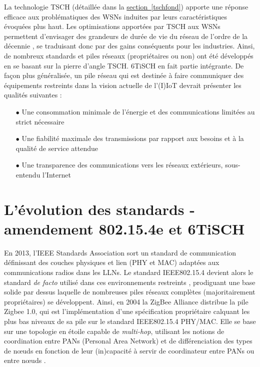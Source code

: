 \documentclass[]{report}
\newcommand{\wordlink}[2]{\hyperref[#2]{#1~\ref{#2}}}
\begin{document}
\par La technologie TSCH (détaillée dans la \wordlink{section}{tschfond}) apporte une réponse efficace aux problématiques des WSNs induites par leurs caractéristiques évoquées plus haut. Les optimisations apportées par TSCH aux WSNs permettent d'envisager des grandeurs de durée de vie du réseau de l'ordre de la décennie \cite{SODA}, se traduisant donc par des gains conséquents pour les industries. Ainsi, de nombreux standards et piles réseaux (propriétaires ou non) ont été développés en se basant sur la pierre d'angle TSCH. 6TiSCH en fait partie intégrante. De façon plus généralisée, un pile réseau qui est destinée à faire communiquer des équipements restreints dans la vision actuelle de l'(I)IoT devrait présenter les qualités suivantes \cite{stack-IoT} :\\
\begin{itemize}
\vspace{0.2cm}
\item[$\bullet$] Une consommation minimale de l'énergie et des communications limitées au strict nécessaire
\vspace{0.2cm}
\item[$\bullet$] Une fiabilité maximale des transmissions par rapport aux besoins et à la qualité de service attendue
\vspace{0.2cm}
\item[$\bullet$] Une transparence des communications vers les réseaux extérieurs, sous-entendu l'Internet \cite{6TiSCH-industrial-perf}
\end{itemize}

\newpage

\section{L'évolution des standards - amendement 802.15.4e et 6TiSCH}

En 2013, l'IEEE Standards Association sort un standard de communication définissant des couches physiques et lien (PHY et MAC) adaptées aux communications radios dans les LLNs. Le standard IEEE802.15.4 devient alors le standard \textit{de facto} utilisé dans ces environnements restreints \cite{6top-perf}, prodiguant une base solide par dessus laquelle de nombreuses piles réseaux complètes (majoritairement propriétaires) se développent. Ainsi, en 2004 la ZigBee Alliance distribue la pile Zigbee 1.0, qui est l'implémentation d'une spécification propriétaire calquant les plus bas niveaux de sa pile sur le standard IEEE802.15.4 PHY/MAC. Elle se base sur une topologie en étoile capable de \textit{multi-hop}, utilisant les notions de coordination entre PANs (Personal Area Network) et de différenciation des types de nœuds en fonction de leur (in)capacité à servir de coordinateur entre PANs ou entre nœuds \cite{stack-IoT}.\\
\end{document}
